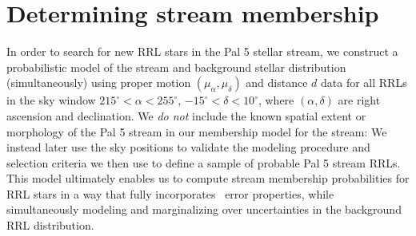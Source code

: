\documentclass[twocolumn]{aastex63}
\newcommand{\sa}[1]{{\color{teal} SP: #1}}
\begin{document}


\section{Determining stream membership} \label{sec:membership}

In order to search for new RRL stars in the Pal 5 stellar stream, we construct a probabilistic model of the stream and background stellar distribution (simultaneously) using proper motion $(\mu_\alpha, \mu_\delta)$ and distance $d$ data for all RRLs in the sky window $215^\circ < \alpha < 255^\circ$, $-15^\circ < \delta < 10^\circ$, where $(\alpha, \delta)$ are right ascension and declination.
We \emph{do not} include the known spatial extent or morphology of the Pal 5 stream in our membership model for the stream: We instead later use the sky positions to validate the modeling procedure and selection criteria we then use to define a sample of probable Pal 5 stream RRLs.
This model ultimately enables us to compute stream membership probabilities for RRL stars in a way that fully incorporates \Gaia\ error properties, while simultaneously modeling and marginalizing over uncertainties in the background RRL distribution.
\end{document}
